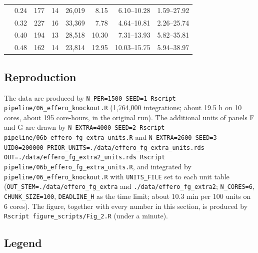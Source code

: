 \documentclass[11pt]{article}
\begin{document}
\begin{table}[H]
\begin{tabular}{llrrrrrr}
  & $0.24$ & 177 & 14 & 26{,}019 & 8.15 & 6.10--10.28 & 1.59--27.92 \\
  & $0.32$ & 227 & 16 & 33{,}369 & 7.78 & 4.64--10.81 & 2.26--25.74 \\
  & $0.40$ & 194 & 13 & 28{,}518 & 10.30 & 7.31--13.93 & 5.82--35.81 \\
  & $0.48$ & 162 & 14 & 23{,}814 & 12.95 & 10.03--15.75 & 5.94--38.97 \\
\bottomrule
\end{tabular}
\end{table}

\subsection{Reproduction}
The data are produced by
\texttt{N\_PER=1500 SEED=1 Rscript pipeline/06\_effero\_knockout.R}
(1{,}764{,}000 integrations; about 19.5 h on 10 cores, about 195 core-hours, in the
original run). The
additional units of panels F and G are drawn by
\texttt{N\_EXTRA=4000 SEED=2 Rscript pipeline/06b\_effero\_fg\_extra\_units.R} and
\texttt{N\_EXTRA=2600 SEED=3 UID0=200000 PRIOR\_UNITS=./data/effero\_fg\_extra\_units.rds}
\texttt{OUT=./data/effero\_fg\_extra2\_units.rds Rscript pipeline/06b\_effero\_fg\_extra\_units.R},
and integrated by \texttt{pipeline/06\_effero\_knockout.R} with \texttt{UNITS\_FILE} set
to each unit table (\texttt{OUT\_STEM=./data/effero\_fg\_extra} and
\texttt{./data/effero\_fg\_extra2}; \texttt{N\_CORES=6}, \texttt{CHUNK\_SIZE=100},
\texttt{DEADLINE\_H} as the time limit; about 10.3 min per 100 units on 6 cores).
The figure, together with every number in this section, is produced by
\texttt{Rscript figure\_scripts/Fig\_2.R} (under a minute).

\subsection{Legend}

\end{document}
